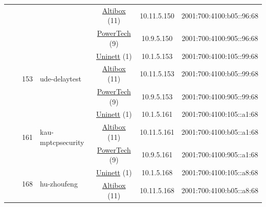 \begin{small}
\begin{center}
\begin{longtable}{|c|c|c|c|c|c|c|c|}
  &  &  &  & \multicolumn{2}{|c|}{\tiny{\href{https://www.altibox.no}{Altibox} (11)}} & \tiny{10.11.5.150} & \tiny{2001:700:4100:b05::96:68} \\* \cline{5-5}\cline{6-6}\cline{7-7}\cline{8-8}
  &  &  &  & \multicolumn{2}{|c|}{\tiny{\href{http://www.powertech.no}{PowerTech} (9)}} & \tiny{10.9.5.150} & \tiny{2001:700:4100:905::96:68} \\* \cline{3-3}\cline{4-4}\cline{5-5}\cline{6-6}\cline{7-7}\cline{8-8}
  &  & \multirow{3}{*}{\tiny{153}} & \multicolumn{1}{|l|}{\multirow{3}{*}{\tiny{ude-delaytest}}} & \multicolumn{2}{|c|}{\tiny{\href{https://www.uninett.no}{Uninett} (1)}} & \tiny{10.1.5.153} & \tiny{2001:700:4100:105::99:68} \\* \cline{5-5}\cline{6-6}\cline{7-7}\cline{8-8}
  &  &  &  & \multicolumn{2}{|c|}{\tiny{\href{https://www.altibox.no}{Altibox} (11)}} & \tiny{10.11.5.153} & \tiny{2001:700:4100:b05::99:68} \\* \cline{5-5}\cline{6-6}\cline{7-7}\cline{8-8}
  &  &  &  & \multicolumn{2}{|c|}{\tiny{\href{http://www.powertech.no}{PowerTech} (9)}} & \tiny{10.9.5.153} & \tiny{2001:700:4100:905::99:68} \\* \cline{3-3}\cline{4-4}\cline{5-5}\cline{6-6}\cline{7-7}\cline{8-8}
  &  & \multirow{3}{*}{\tiny{161}} & \multicolumn{1}{|l|}{\multirow{3}{*}{\tiny{kau-mptcpsecurity}}} & \multicolumn{2}{|c|}{\tiny{\href{https://www.uninett.no}{Uninett} (1)}} & \tiny{10.1.5.161} & \tiny{2001:700:4100:105::a1:68} \\* \cline{5-5}\cline{6-6}\cline{7-7}\cline{8-8}
  &  &  &  & \multicolumn{2}{|c|}{\tiny{\href{https://www.altibox.no}{Altibox} (11)}} & \tiny{10.11.5.161} & \tiny{2001:700:4100:b05::a1:68} \\* \cline{5-5}\cline{6-6}\cline{7-7}\cline{8-8}
  &  &  &  & \multicolumn{2}{|c|}{\tiny{\href{http://www.powertech.no}{PowerTech} (9)}} & \tiny{10.9.5.161} & \tiny{2001:700:4100:905::a1:68} \\* \cline{3-3}\cline{4-4}\cline{5-5}\cline{6-6}\cline{7-7}\cline{8-8}
  &  & \multirow{3}{*}{\tiny{168}} & \multicolumn{1}{|l|}{\multirow{3}{*}{\tiny{hu-zhoufeng}}} & \multicolumn{2}{|c|}{\tiny{\href{https://www.uninett.no}{Uninett} (1)}} & \tiny{10.1.5.168} & \tiny{2001:700:4100:105::a8:68} \\* \cline{5-5}\cline{6-6}\cline{7-7}\cline{8-8}
  &  &  &  & \multicolumn{2}{|c|}{\tiny{\href{https://www.altibox.no}{Altibox} (11)}} & \tiny{10.11.5.168} & \tiny{2001:700:4100:b05::a8:68} \\* \cline{5-5}\cline{6-6}\cline{7-7}\cline{8-8}

\end{longtable}
\end{center}
\end{small}
